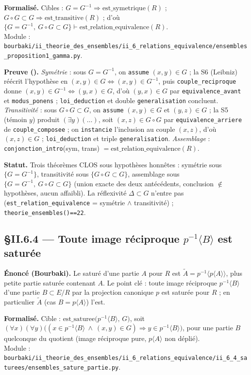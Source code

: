 \textbf{Formalisé.} Cibles : $G = G^{-1} \Rightarrow \mathrm{est\_symetrique}(R)$ ;
$G \circ G \subset G \Rightarrow \mathrm{est\_transitive}(R)$ ; d'où
$\{G = G^{-1},\ G \circ G \subset G\} \vdash \mathrm{est\_relation\_equivalence}(R)$. \\
Module : \texttt{bourbaki/ii\_theorie\_des\_ensembles/ii\_6\_relations\_equivalence/ensembles\_proposition1\_gamma.py}.

\textbf{Preuve (\Nstar).} \emph{Symétrie} : sous $G = G^{-1}$, on \texttt{assume} $(x,y) \in G$ ;
la S6 (Leibniz) réécrit l'hypothèse en $(x,y)\in G \Leftrightarrow (x,y)\in G^{-1}$, puis
\texttt{couple\_reciproque} donne $(x,y)\in G^{-1} \Leftrightarrow (y,x)\in G$, d'où $(y,x)\in G$
par \texttt{equivalence\_avant} et \texttt{modus\_ponens} ; \texttt{loi\_deduction} et double
\texttt{generalisation} concluent. \emph{Transitivité} : sous $G\circ G \subset G$, on \texttt{assume}
$(x,y)\in G$ et $(y,z)\in G$ ; la S5 (témoin $y$) produit $(\exists y)(\ldots)$, soit $(x,z)\in G\circ G$
par \texttt{equivalence\_arriere} de \texttt{couple\_composee} ; on \texttt{instancie} l'inclusion au
couple $(x,z)$, d'où $(x,z)\in G$ ; \texttt{loi\_deduction} et triple \texttt{generalisation}.
\emph{Assemblage} : \texttt{conjonction\_intro}(sym, trans) $= \mathrm{est\_relation\_equivalence}(R)$.

\textbf{Statut.} Trois théorèmes CLOS sous hypothèses honnêtes : symétrie sous $\{G = G^{-1}\}$,
transitivité sous $\{G \circ G \subset G\}$, assemblage sous $\{G = G^{-1},\ G \circ G \subset G\}$
(union exacte des deux antécédents, conclusion $\notin$ hypothèses, aucun affaibli). La réflexivité
$\Delta \subset G$ n'entre pas (\texttt{est\_relation\_equivalence} = symétrie $\wedge$ transitivité) ;
\texttt{theorie\_ensembles()==22}.

\subsection{§II.6.4 --- Toute image réciproque $p^{-1}\langle B\rangle$ est saturée}
\textbf{Énoncé (Bourbaki).} Le saturé d'une partie $A$ pour $R$ est $\tilde{A} = p^{-1}\langle p\langle A\rangle\rangle$,
plus petite partie saturée contenant $A$. Le point clé : toute image réciproque $p^{-1}\langle B\rangle$
d'une partie $B \subset E/R$ par la projection canonique $p$ est saturée pour $R$ ; en particulier
$\tilde{A}$ (cas $B = p\langle A\rangle$) l'est.

\textbf{Formalisé.} Cible : $\mathrm{est\_saturee}\bigl(p^{-1}\langle B\rangle,\, G\bigr)$, soit
$(\forall x)(\forall y)\bigl((x \in p^{-1}\langle B\rangle \ \wedge\ (x,y)\in G) \Rightarrow y \in p^{-1}\langle B\rangle\bigr)$,
pour une partie $B$ quelconque du quotient (image réciproque pure, $p\langle A\rangle$ non déplié). \\
Module : \texttt{bourbaki/ii\_theorie\_des\_ensembles/ii\_6\_relations\_equivalence/ii\_6\_4\_saturees/ensembles\_sature\_partie.py}.


